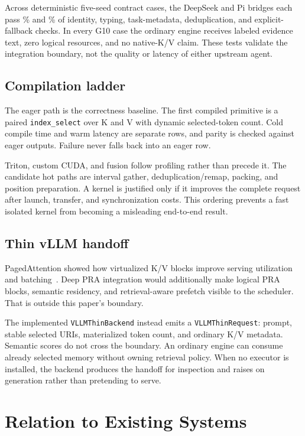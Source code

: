\documentclass[11pt]{article}
\begin{document}
Across \AgentPluginCases{} deterministic five-seed contract cases, the DeepSeek
and Pi bridges each pass \DeepSeekPluginPass\% and \PiPluginPass\% of identity,
typing, task-metadata, deduplication, and explicit-fallback checks. In every G10
case the ordinary engine receives labeled evidence text, zero logical resources,
and no native-K/V claim. These tests validate the integration boundary, not the
quality or latency of either upstream agent.

\subsection{Compilation ladder}

The eager path is the correctness baseline.  The first compiled primitive is a
paired \texttt{index\_select} over K and V with dynamic selected-token count.
Cold compile time and warm latency are separate rows, and parity is checked
against eager outputs.  Failure never falls back into an eager row.

Triton, custom CUDA, and fusion follow profiling rather than precede it.  The
candidate hot paths are interval gather, deduplication/remap, packing, and
position preparation.  A kernel is justified only if it improves the complete
request after launch, transfer, and synchronization costs.  This ordering
prevents a fast isolated kernel from becoming a misleading end-to-end result.

\subsection{Thin vLLM handoff}

PagedAttention showed how virtualized K/V blocks improve serving utilization
and batching~\cite{kwon2023vllm}.  Deep PRA integration would additionally make
logical PRA blocks, semantic residency, and retrieval-aware prefetch visible to
the scheduler.  That is outside this paper's boundary.

The implemented \texttt{VLLMThinBackend} instead emits a
\texttt{VLLMThinRequest}: prompt, stable selected URIs, materialized token count,
and ordinary K/V metadata.  Semantic scores do not cross the boundary.  An
ordinary engine can consume already selected memory without owning retrieval
policy.  When no executor is installed, the backend produces the handoff for
inspection and raises on generation rather than pretending to serve.

\section{Relation to Existing Systems}
\end{document}

